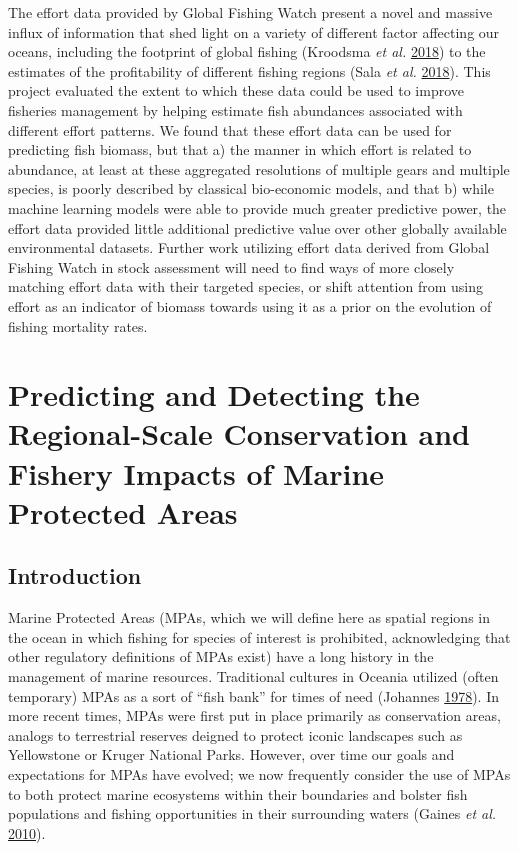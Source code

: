 \documentclass[twoside,12pt,final]{ucthesis-CA2012}
\begin{document}
\begin{ucmainmatter}
The effort data provided by Global Fishing Watch present a novel and
massive influx of information that shed light on a variety of different
factor affecting our oceans, including the footprint of global fishing
(Kroodsma \emph{et al.} \protect\hyperlink{ref-Kroodsma2018}{2018}) to
the estimates of the profitability of different fishing regions (Sala
\emph{et al.} \protect\hyperlink{ref-Sala2018}{2018}). This project
evaluated the extent to which these data could be used to improve
fisheries management by helping estimate fish abundances associated with
different effort patterns. We found that these effort data can be used
for predicting fish biomass, but that a) the manner in which effort is
related to abundance, at least at these aggregated resolutions of
multiple gears and multiple species, is poorly described by classical
bio-economic models, and that b) while machine learning models were able
to provide much greater predictive power, the effort data provided
little additional predictive value over other globally available
environmental datasets. Further work utilizing effort data derived from
Global Fishing Watch in stock assessment will need to find ways of more
closely matching effort data with their targeted species, or shift
attention from using effort as an indicator of biomass towards using it
as a prior on the evolution of fishing mortality rates.

\chapter{Predicting and Detecting the Regional-Scale Conservation and
Fishery Impacts of Marine Protected Areas}\label{zissou}

\section{Introduction}\label{introduction-2}

Marine Protected Areas (MPAs, which we will define here as spatial
regions in the ocean in which fishing for species of interest is
prohibited, acknowledging that other regulatory definitions of MPAs
exist) have a long history in the management of marine resources.
Traditional cultures in Oceania utilized (often temporary) MPAs as a
sort of ``fish bank'' for times of need (Johannes
\protect\hyperlink{ref-Johannes1978}{1978}). In more recent times, MPAs
were first put in place primarily as conservation areas, analogs to
terrestrial reserves deigned to protect iconic landscapes such as
Yellowstone or Kruger National Parks. However, over time our goals and
expectations for MPAs have evolved; we now frequently consider the use
of MPAs to both protect marine ecosystems within their boundaries and
bolster fish populations and fishing opportunities in their surrounding
waters (Gaines \emph{et al.} \protect\hyperlink{ref-Gaines2010}{2010}).


\end{ucmainmatter}
\end{document}
